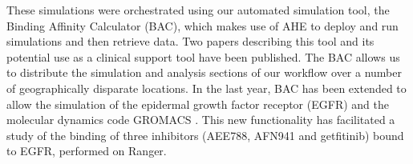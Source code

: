These simulations were orchestrated using our automated simulation tool, the Binding Affinity Calculator (BAC), which makes use of AHE \cite{coveney2007,zasada2009} to deploy and run simulations and then retrieve data. Two papers describing this tool and its potential use as a clinical support tool have been published\cite{Sadiq2008, Sadiq2008a}. The BAC allows us to distribute the simulation and analysis sections of our workflow over a number of geographically disparate locations. 
In the last year, BAC has been extended to allow the simulation of the epidermal growth factor receptor (EGFR) and the molecular dynamics code GROMACS \cite{Hess2008}.  This new functionality has facilitated a study of the binding of three inhibitors (AEE788, AFN941 and getfitinib) bound to EGFR, performed on Ranger.

